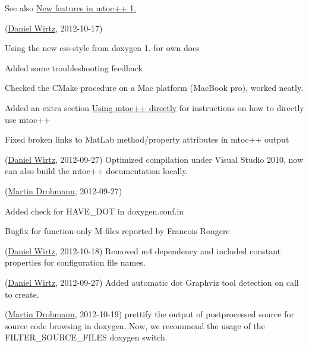 See also \hyperlink{newfeat1_4}{New features in mtoc++ 1.}


\begin{DoxyRefList}
\item[\label{changelog1_4__changelog1_4000006}%
\hypertarget{changelog1_4__changelog1_4000006}{}%
Page \hyperlink{changes}{Changes and new features in mtoc++} ](\hyperlink{developers_dw}{Daniel Wirtz}, 2012-\/10-\/17)
\begin{DoxyItemize}
\item Using the new css-\/style from doxygen 1. for own docs
\item Added some troubleshooting feedback
\item Checked the C\+Make procedure on a Mac platform (Mac\+Book pro), worked neatly.
\item Added an extra section \hyperlink{tools_tools_direct}{Using mtoc++ directly} for instructions on how to directly use mtoc++
\item Fixed broken links to Mat\+Lab method/property attributes in mtoc++ output
\end{DoxyItemize}

(\hyperlink{developers_dw}{Daniel Wirtz}, 2012-\/09-\/27) Optimized compilation under Visual Studio 2010, now can also build the mtoc++ documentation locally.

(\hyperlink{developers_md}{Martin Drohmann}, 2012-\/09-\/27)
\begin{DoxyItemize}
\item Added check for H\+A\+V\+E\+\_\+\+D\+O\+T in doxygen.\+conf.\+in
\item Bugfix for function-\/only M-\/files reported by Francois Rongere 
\end{DoxyItemize}
\item[\label{changelog1_4__changelog1_4000001}%
\hypertarget{changelog1_4__changelog1_4000001}{}%
Class \hyperlink{class_matlab_doc_maker}{Matlab\+Doc\+Maker} ](\hyperlink{developers_dw}{Daniel Wirtz}, 2012-\/10-\/18) Removed {\ttfamily m4} dependency and included constant properties for configuration file names.

(\hyperlink{developers_dw}{Daniel Wirtz}, 2012-\/09-\/27) Added automatic dot Graphviz tool detection on call to create. 
\item[\label{changelog1_4__changelog1_4000003}%
\hypertarget{changelog1_4__changelog1_4000003}{}%
Class \hyperlink{class_m_file_scanner}{M\+File\+Scanner} ](\hyperlink{developers_md}{Martin Drohmann}, 2012-\/10-\/19) prettify the output of postprocessed source for source code browsing in doxygen. Now, we recommend the usage of the F\+I\+L\+T\+E\+R\+\_\+\+S\+O\+U\+R\+C\+E\+\_\+\+F\+I\+L\+E\+S doxygen switch.


\end{DoxyRefList}
